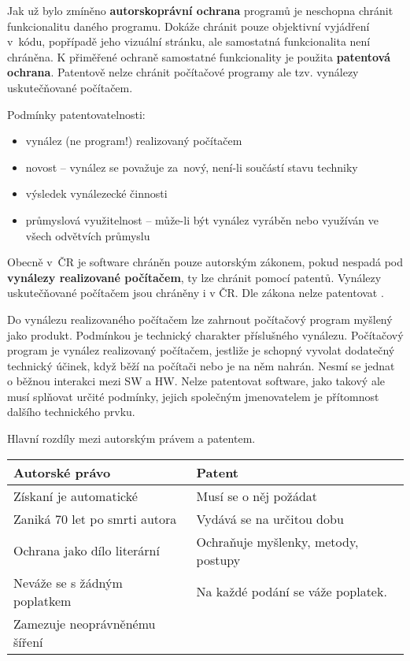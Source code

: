Jak už bylo zmíněno \textbf{autorskoprávní ochrana} programů je neschopna chránit funkcionalitu daného programu. Dokáže chránit pouze objektivní vyjádření v~kódu, popřípadě jeho vizuální stránku, ale samostatná funkcionalita není chráněna. K přiměřené ochraně samostatné funkcionality je použita \textbf{patentová ochrana}. Patentově nelze chránit počítačové programy ale tzv. vynálezy uskutečňované počítačem.
\newline

\noindent Podmínky patentovatelnosti:
\begin{itemize}[noitemsep]
    \item vynález (ne program!) realizovaný počítačem
    \item novost -- vynález se považuje za~nový, není-li součástí stavu techniky
    \item výsledek vynálezecké činnosti
    \item průmyslová využitelnost -- může-li být vynález vyráběn nebo využíván ve všech odvětvích průmyslu
\end{itemize}
Obecně v~ČR je software chráněn pouze autorským zákonem, pokud nespadá pod \textbf{vynálezy realizované počítačem}, ty lze chránit pomocí patentů.  
Vynálezy uskutečňované počítačem jsou chráněny i v ČR. Dle zákona nelze patentovat .

Do vynálezu realizovaného počítačem lze zahrnout počítačový program myšlený jako produkt. Podmínkou je technický charakter příslušného vynálezu. Počítačový program je vynález realizovaný počítačem, jestliže je schopný vyvolat dodatečný technický účinek, když běží na počítači nebo je na něm nahrán. Nesmí se jednat o běžnou interakci mezi SW a HW. Nelze patentovat software, jako takový ale musí splňovat určité podmínky, jejich společným jmenovatelem je přítomnost dalšího technického prvku. 

Hlavní rozdíly mezi autorským právem a patentem.

\begin{center}
    \begin{tabular}{|l|l|}
    \hline
        Autorské právo & Patent \\\hline
        Získaní je automatické & Musí se o něj požádat\\\hline
        Zaniká 70 let po smrti autora & Vydává se na určitou dobu\\\hline
        Ochrana jako dílo literární & Ochraňuje myšlenky, metody, postupy\\\hline
        Neváže se s žádným poplatkem & Na každé podání se váže poplatek.\\\hline
        Zamezuje neoprávněnému šíření & \\\hline
    \end{tabular}
\end{center}







